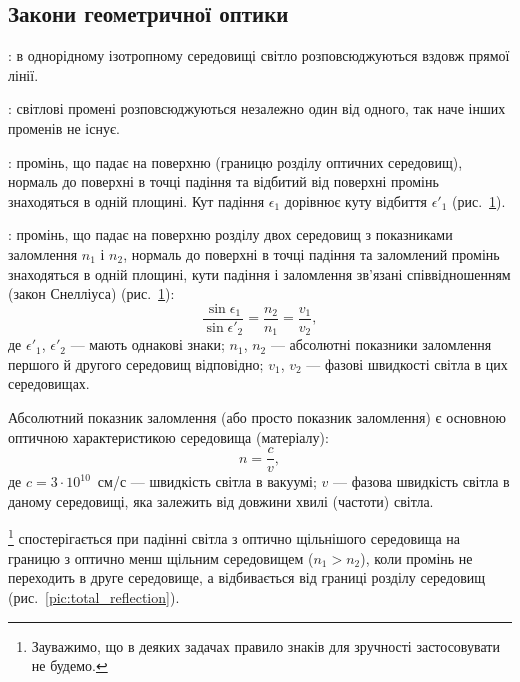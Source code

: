 \subsection*{Закони геометричної оптики}


: в однорідному ізотропному середовищі світло розповсюджуються вздовж прямої лінії.

: світлові промені розповсюджуються незалежно один від одного, так наче інших променів не існує.

: промінь, що падає на поверхню (границю розділу оптичних
середовищ), нормаль до поверхні в точці падіння та відбитий від поверхні промінь знаходяться в одній площині. Кут падіння $\epsilon_1$ дорівнює куту
відбиття $\epsilon'_1$ (рис.~\ref{pic:ReflAndRefr}).

: промінь, що падає на поверхню розділу двох середовищ з
показниками заломлення $n_1$ і $n_2$, нормаль до поверхні в точці падіння та
заломлений промінь знаходяться в одній площині, кути падіння і
заломлення зв’язані співвідношенням (закон Снелліуса) (рис.~\ref{pic:ReflAndRefr}):
\begin{equation}\label{eq:Snell}
	\frac{\sin\epsilon_1}{\sin\epsilon'_2} = \frac{n_2}{n_1} = \frac{v_1}{v_2},
\end{equation}
де $\epsilon'_1$, $\epsilon'_2$ --- мають однакові знаки; $n_1$, $n_2$ --- абсолютні показники заломлення першого й другого середовищ відповідно; $v_1$, $v_2$ --- фазові швидкості світла в цих середовищах.

Абсолютний показник заломлення (або просто показник заломлення)
є основною оптичною характеристикою середовища (матеріалу):
\begin{equation}\label{eq:n}
	n = \frac{c}{v},
\end{equation}
де $c = 3\cdot 10^{10}$~см/с --- швидкість світла в вакуумі; $v$ --- фазова швидкість світла в даному середовищі, яка залежить від довжини хвилі (частоти) світла.

\begin{figure}[!h]\centering
    
	\caption{}
	\label{pic:ReflAndRefr}
\end{figure}

\footnote{Зауважимо, що в деяких задачах правило знаків для зручності застосовувати не будемо.} спостерігається при падінні
світла з оптично щільнішого середовища на границю з оптично менш
щільним середовищем ($n_1 > n_2$), коли промінь не переходить в друге
середовище, а відбивається від границі розділу середовищ (рис.~\ref{pic:total_reflection}).

